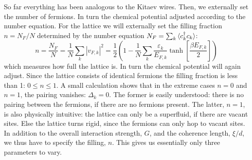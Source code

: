 So far everything has been analogous to the Kitaev wires. Then, we externally set the number of fermions. In turn the chemical potential adjusted according to the number equation. For the lattice we will externally set the filling fraction $n = N_F / N$ determined by the number equation $N_F = \sum_k \braket{c^\dagger_k c_k}$:
\begin{equation}
n = \frac{N_F}{N} = \frac{1}{N}\sum_k |v_{F,k}|^2 = \frac{1}{2}\left(1 - \frac{1}{N}\sum_k \frac{\varepsilon_k}{E_{F,k}}\tanh\left[\frac{\beta E_{F,k}}{2} \right] \right) 
\label{eq.fillingfraction.lattice}
\end{equation}
which measures how full the lattice is. In turn the chemical potential will again adjust. Since the lattice consists of identical fermions the filling fraction is less than 1: $0 \leq n \leq 1$. A small calculation shows that in the extreme cases $n = 0$ and $n = 1$, the pairing vanishes: $\Delta_k = 0$. The former is easily understood: there is no pairing between the fermions, if there are no fermions present. The latter, $n = 1$, is also physically intuitive: the lattice can only be a superfluid, if there are vacant sites. Else the lattice turns rigid, since the fermions can only hop to vacant sites. In addition to the overall interaction strength, $G$, and the coherence length, $\xi / d$, we thus have to specify the filling, $n$. This gives us essentially only three parameters to vary. 

